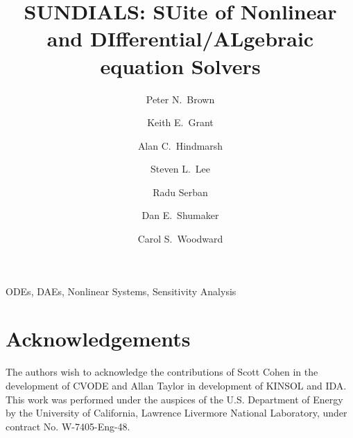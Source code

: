 \documentclass[11pt]{article}
\title{SUNDIALS: SUite of Nonlinear and DIfferential/ALgebraic\\
       equation Solvers}
\author{Peter N.~Brown \and Keith E.~Grant \and Alan C.~Hindmarsh 
\and Steven L.~Lee \and Radu Serban \and Dan E.~Shumaker 
\and Carol S.~Woodward}
\begin{document}

\maketitle

\setcounter{page}{1}



 ODEs, DAEs, Nonlinear Systems,
Sensitivity Analysis




   
   
   








\section{Acknowledgements}

The authors wish to acknowledge the contributions of Scott Cohen
in the development of CVODE and Allan Taylor in development of
KINSOL and IDA.  This work was performed under the auspices of the
U.S. Department of Energy by the University of California,
Lawrence Livermore National Laboratory, under contract No.
W-7405-Eng-48.



\end{document}
